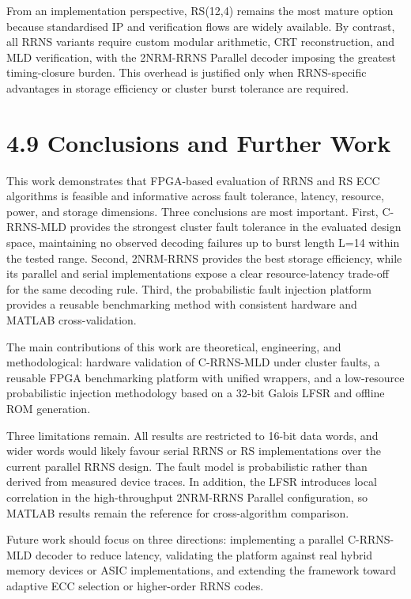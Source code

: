 \documentclass[
  english,
  12pt,
]{report}
\begin{document}
From an implementation perspective, RS(12,4) remains the most mature
option because standardised IP and verification flows are widely
available. By contrast, all RRNS variants require custom modular
arithmetic, CRT reconstruction, and MLD verification, with the 2NRM-RRNS
Parallel decoder imposing the greatest timing-closure burden. This
overhead is justified only when RRNS-specific advantages in storage
efficiency or cluster burst tolerance are required.

\section{4.9 Conclusions and Further
Work}\label{conclusions-and-further-work}

This work demonstrates that FPGA-based evaluation of RRNS and RS ECC
algorithms is feasible and informative across fault tolerance, latency,
resource, power, and storage dimensions. Three conclusions are most
important. First, C-RRNS-MLD provides the strongest cluster fault
tolerance in the evaluated design space, maintaining no observed
decoding failures up to burst length L=14 within the tested range.
Second, 2NRM-RRNS provides the best storage efficiency, while its
parallel and serial implementations expose a clear resource-latency
trade-off for the same decoding rule. Third, the probabilistic fault
injection platform provides a reusable benchmarking method with
consistent hardware and MATLAB cross-validation.

The main contributions of this work are theoretical, engineering, and
methodological: hardware validation of C-RRNS-MLD under cluster faults,
a reusable FPGA benchmarking platform with unified wrappers, and a
low-resource probabilistic injection methodology based on a 32-bit
Galois LFSR and offline ROM generation.

Three limitations remain. All results are restricted to 16-bit data
words, and wider words would likely favour serial RRNS or RS
implementations over the current parallel RRNS design. The fault model
is probabilistic rather than derived from measured device traces. In
addition, the LFSR introduces local correlation in the high-throughput
2NRM-RRNS Parallel configuration, so MATLAB results remain the reference
for cross-algorithm comparison.

Future work should focus on three directions: implementing a parallel
C-RRNS-MLD decoder to reduce latency, validating the platform against
real hybrid memory devices or ASIC implementations, and extending the
framework toward adaptive ECC selection or higher-order RRNS codes.
\end{document}
